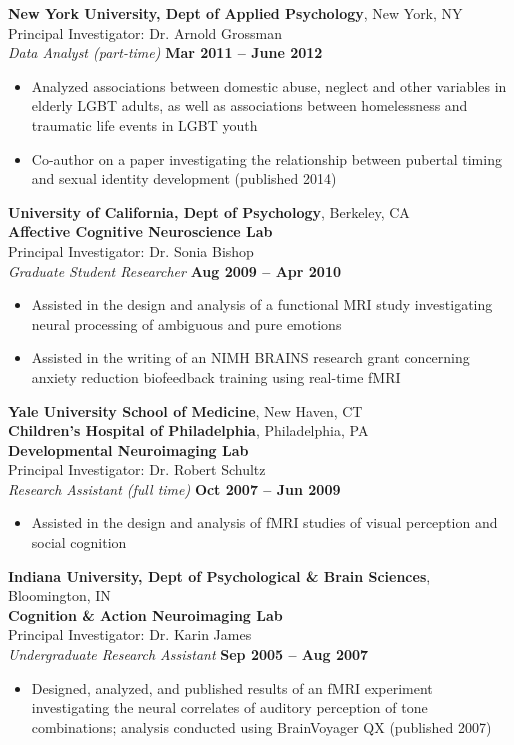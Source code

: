 \documentclass{article}
\begin{document}
 {\bf New York University, Dept of Applied Psychology}, New York, NY\\
 Principal Investigator: Dr. Arnold Grossman\\
 {\it Data Analyst (part-time)} \hfill {\bf Mar 2011 -- June 2012}
 \begin{itemize} \itemsep -2pt
  \item Analyzed associations between domestic abuse, neglect and
        other variables in elderly LGBT adults, as well as associations
        between homelessness and traumatic life events in LGBT youth
  \item Co-author on a paper investigating the relationship between
        pubertal timing and sexual identity development (published 2014)
 \end{itemize}

 {\bf University of California, Dept of Psychology}, Berkeley, CA\\
 {\bf Affective Cognitive Neuroscience Lab}\\
 Principal Investigator: Dr. Sonia Bishop\\
 {\it Graduate Student Researcher} \hfill {\bf Aug 2009 -- Apr 2010}
 \begin{itemize} \itemsep -2pt
  \item Assisted in the design and analysis of a functional MRI study 
        investigating neural processing of ambiguous and pure emotions 
  \item Assisted in the writing of an NIMH BRAINS research grant concerning
        anxiety reduction biofeedback training using real-time fMRI
 \end{itemize}

 {\bf Yale University School of Medicine}, New Haven, CT\\
 {\bf Children's Hospital of Philadelphia}, Philadelphia, PA\\
 {\bf Developmental Neuroimaging Lab}\\
 Principal Investigator: Dr. Robert Schultz\\
 {\it Research Assistant (full time)} \hfill {\bf Oct 2007 -- Jun 2009}
 \begin{itemize} \itemsep -2pt
  \item Assisted in the design and analysis of fMRI studies of
        visual perception and social cognition
 \end{itemize}

 {\bf Indiana University, Dept of Psychological \& Brain Sciences}, Bloomington, IN\\
 {\bf Cognition \& Action Neuroimaging Lab}\\
 Principal Investigator: Dr. Karin James\\
 {\it Undergraduate Research Assistant} \hfill {\bf Sep 2005 -- Aug 2007}
 \begin{itemize} \itemsep -2pt
  \item Designed, analyzed, and published results of an fMRI experiment 
        investigating the neural correlates of auditory perception of tone 
	combinations; analysis conducted using BrainVoyager QX (published 2007)
 \end{itemize}
 
\end{document}

